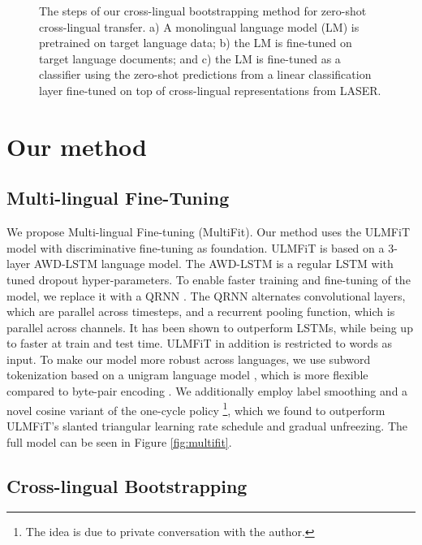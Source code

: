 \documentclass[11pt,a4paper]{article}
\begin{document}
\begin{figure}
\centering

\caption{The steps of our cross-lingual bootstrapping method for zero-shot cross-lingual transfer. a) A monolingual language model (LM) is pretrained on target language data; b) the LM is fine-tuned on target language documents; and c) the LM is fine-tuned as a classifier using the zero-shot predictions from a linear classification layer fine-tuned on top of cross-lingual representations from LASER.}
\label{fig:pipeline}
\end{figure}

\section{Our method}

\subsection{Multi-lingual Fine-Tuning}

We propose Multi-lingual Fine-tuning (MultiFit). Our method uses the ULMFiT model \cite{Howard2018} with discriminative fine-tuning as foundation. ULMFiT is based on a 3-layer AWD-LSTM \cite{Merity2017} language model. The AWD-LSTM is a regular LSTM \cite{Hochreiter1997} with tuned dropout hyper-parameters. To enable faster training and fine-tuning of the model, we replace it with a QRNN \cite{Bradbury2017}. The QRNN alternates convolutional layers, which are parallel across timesteps, and a recurrent pooling function, which is parallel across channels. It has been shown to outperform LSTMs, while being up to  faster at train and test time. ULMFiT in addition is restricted to words as input. To make our model more robust across languages, we use subword tokenization based on a unigram language model \cite{Kudo2018}, which is more flexible compared to byte-pair encoding \cite{Sennrich2016}. We additionally employ label smoothing \cite{Szegedy2016} and a novel cosine variant of the one-cycle policy \cite{smith2018disciplined}\footnote{The idea is due to private conversation with the author.}, which we found to outperform ULMFiT's slanted triangular learning rate schedule and gradual unfreezing. The full model can be seen in Figure \ref{fig:multifit}.

\subsection{Cross-lingual Bootstrapping}
\end{document}

